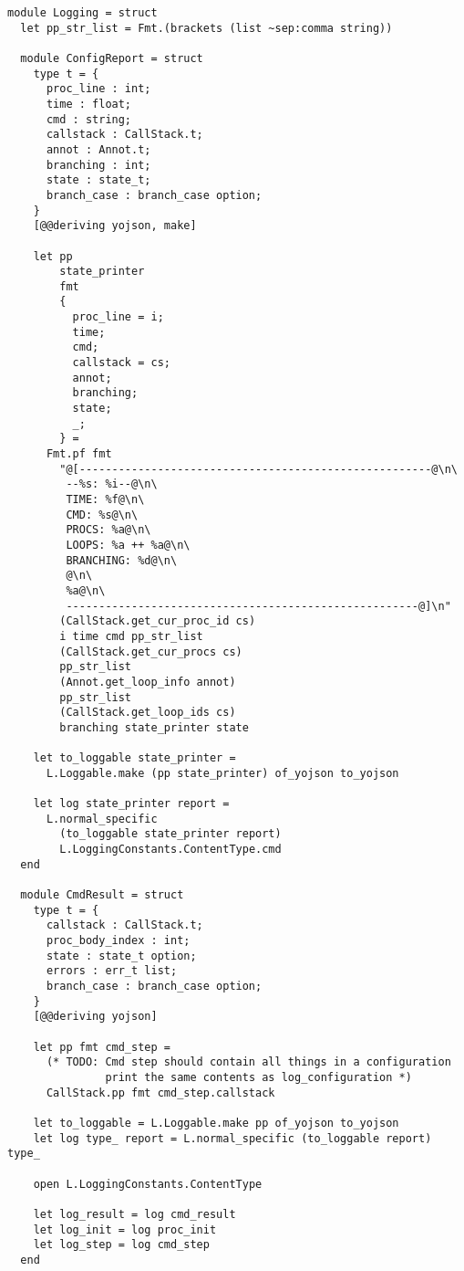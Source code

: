 \begin{lstlisting}[caption={
  Logging types for the interpreter, inside the \texttt{GInterpreter} module
  \label{lst:interpreter-logging}}, style=code]
module Logging = struct
  let pp_str_list = Fmt.(brackets (list ~sep:comma string))

  module ConfigReport = struct
    type t = {
      proc_line : int;
      time : float;
      cmd : string;
      callstack : CallStack.t;
      annot : Annot.t;
      branching : int;
      state : state_t;
      branch_case : branch_case option;
    }
    [@@deriving yojson, make]

    let pp
        state_printer
        fmt
        {
          proc_line = i;
          time;
          cmd;
          callstack = cs;
          annot;
          branching;
          state;
          _;
        } =
      Fmt.pf fmt
        "@[------------------------------------------------------@\n\
         --%s: %i--@\n\
         TIME: %f@\n\
         CMD: %s@\n\
         PROCS: %a@\n\
         LOOPS: %a ++ %a@\n\
         BRANCHING: %d@\n\
         @\n\
         %a@\n\
         ------------------------------------------------------@]\n"
        (CallStack.get_cur_proc_id cs)
        i time cmd pp_str_list
        (CallStack.get_cur_procs cs)
        pp_str_list
        (Annot.get_loop_info annot)
        pp_str_list
        (CallStack.get_loop_ids cs)
        branching state_printer state

    let to_loggable state_printer =
      L.Loggable.make (pp state_printer) of_yojson to_yojson

    let log state_printer report =
      L.normal_specific
        (to_loggable state_printer report)
        L.LoggingConstants.ContentType.cmd
  end

  module CmdResult = struct
    type t = {
      callstack : CallStack.t;
      proc_body_index : int;
      state : state_t option;
      errors : err_t list;
      branch_case : branch_case option;
    }
    [@@deriving yojson]

    let pp fmt cmd_step =
      (* TODO: Cmd step should contain all things in a configuration
               print the same contents as log_configuration *)
      CallStack.pp fmt cmd_step.callstack

    let to_loggable = L.Loggable.make pp of_yojson to_yojson
    let log type_ report = L.normal_specific (to_loggable report) type_

    open L.LoggingConstants.ContentType

    let log_result = log cmd_result
    let log_init = log proc_init
    let log_step = log cmd_step
  end


\end{lstlisting}
